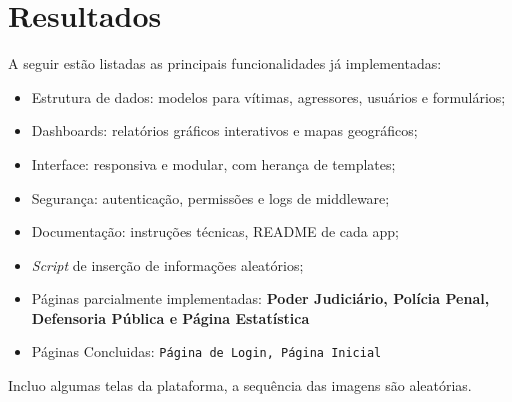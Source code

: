 \section{Resultados}

A seguir estão listadas as principais funcionalidades já implementadas:

\begin{itemize}
    \item Estrutura de dados: modelos para vítimas, agressores, usuários e formulários;
    \item Dashboards: relatórios gráficos interativos e mapas geográficos;
    \item Interface: responsiva e modular, com herança de templates;
    \item Segurança: autenticação, permissões e logs de middleware;
    \item Documentação: instruções técnicas, README de cada app;
    \item \textit{Script} de inserção de informações aleatórios;
    \item Páginas parcialmente implementadas: \textbf{Poder Judiciário, Polícia Penal, Defensoria Pública e Página Estatística}
    \item Páginas Concluidas: \texttt{Página de Login, Página Inicial}
\end{itemize}

\par Incluo algumas telas da plataforma, a sequência das imagens são aleatórias.

